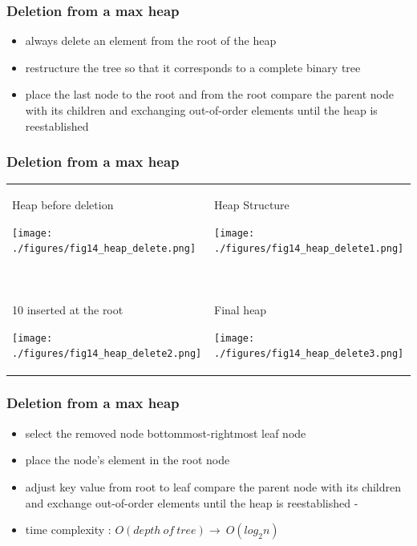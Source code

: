 \documentclass[newPxFont,sthlmFooter,nooffset]{beamer}
\begin{document}
\begin{frame}[t]
  \frametitle{Deletion from a max heap}
  \begin{itemize}
  \item always delete an element from the root of the heap
  \item restructure the tree so that it corresponds to a complete binary tree
  \item place the last node to the root and from the root compare the parent node with its children and exchanging out-of-order elements until the heap is reestablished
  \end{itemize}
\end{frame}


\begin{frame}[t]
  \frametitle{Deletion from a max heap}
  \begin{tabular}{p{} p{}}
Heap before deletion

    \texttt{[image: ./figures/fig14\_heap\_delete.png]}
&    
Heap Structure

    \texttt{[image: ./figures/fig14\_heap\_delete1.png]}
\pause \\
~& ~\\
10 inserted at the root

    \texttt{[image: ./figures/fig14\_heap\_delete2.png]}
&
Final heap

    \texttt{[image: ./figures/fig14\_heap\_delete3.png]}
\\
  \end{tabular}
\end{frame}


\begin{frame}[t]
  \frametitle{Deletion from a max heap}
  \begin{itemize}
  \item select the removed node bottommost-rightmost leaf node
  \item place the node’s element in the root node
  \item adjust key value
    from root to leaf compare the parent node with its children and
    exchange out-of-order elements until the heap is reestablished -
  \item time complexity : $O(depth~of~ tree) \rightarrow~ O(log_2n)$
  \end{itemize}

\end{frame}
\end{document}
